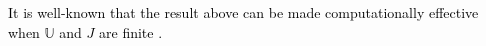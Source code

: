 \documentclass[journal,twoside,web]{ieeecolor}
\newcommand{\Rank}{\mathrm{Rank}}
\begin{document}
\textcolor{black}{It is well-known that the result above can be made computationally effective when $\mathbb{U}$ and $J$ are finite \cite{MFliessHank,Reut:Book}.}
% 
\end{document}
